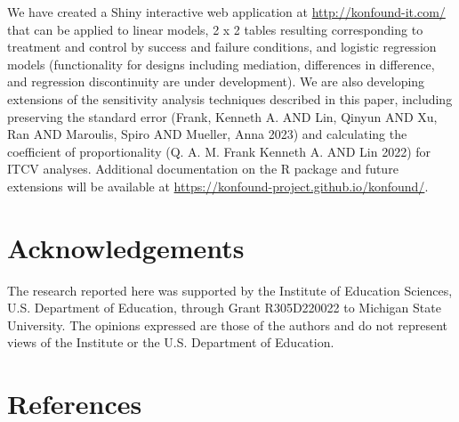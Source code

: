 \documentclass[
]{article}
\begin{document}
We have created a Shiny interactive web application at
\url{http://konfound-it.com/} that can be applied to linear models, 2 x
2 tables resulting corresponding to treatment and control by success and
failure conditions, and logistic regression models (functionality for
designs including mediation, differences in difference, and regression
discontinuity are under development). We are also developing extensions
of the sensitivity analysis techniques described in this paper,
including preserving the standard error (Frank, Kenneth A. AND Lin,
Qinyun AND Xu, Ran AND Maroulis, Spiro AND Mueller, Anna 2023) and
calculating the coefficient of proportionality (Q. A. M. Frank Kenneth
A. AND Lin 2022) for ITCV analyses. Additional documentation on the R
package and future extensions will be available at
\url{https://konfound-project.github.io/konfound/}.

\hypertarget{acknowledgements}{%
\section{Acknowledgements}\label{acknowledgements}}

The research reported here was supported by the Institute of Education
Sciences, U.S. Department of Education, through Grant R305D220022 to
Michigan State University. The opinions expressed are those of the
authors and do not represent views of the Institute or the U.S.
Department of Education.

\hypertarget{references}{%
\section*{References}\label{references}}
\end{document}
